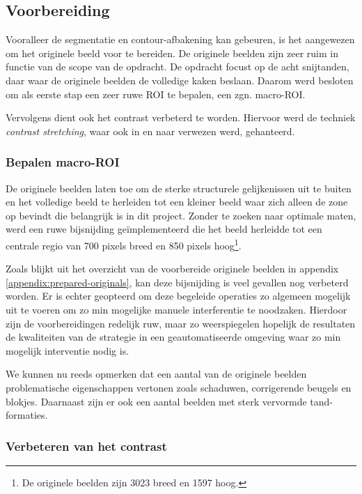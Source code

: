 \documentclass[10pt,a4paper]{article}
\begin{document}
\subsection*{Voorbereiding}

Vooralleer de segmentatie en contour-afbakening kan gebeuren, is het aangewezen om het originele beeld voor te bereiden. De originele beelden zijn zeer ruim in functie van de scope van de opdracht. De opdracht focust op de acht snijtanden, daar waar de originele beelden de volledige kaken beslaan. Daarom werd besloten om als eerste stap een zeer ruwe ROI te bepalen, een zgn. macro-ROI.

Vervolgens dient ook het contrast verbeterd te worden. Hiervoor werd de techniek \emph{contrast stretching}, waar ook in  \cite{piotrowski2000active} en \cite{said2004dental} naar verwezen werd, gehanteerd.

\subsubsection*{Bepalen macro-ROI}

De originele beelden laten toe om de sterke structurele gelijkenissen uit te buiten en het volledige beeld te herleiden tot een kleiner beeld waar zich alleen de zone op bevindt die belangrijk is in dit project. Zonder te zoeken naar optimale maten, werd een ruwe bijsnijding ge\"implementeerd die het beeld herleidde tot een centrale regio van 700 pixels breed en 850 pixels hoog\footnote{De originele beelden zijn 3023 breed en 1597 hoog.}.

Zoals blijkt uit het overzicht van de voorbereide originele beelden in appendix \ref{appendix:prepared-originals}, kan deze bijsnijding is veel gevallen nog verbeterd worden. Er is echter geopteerd om deze begeleide operaties zo algemeen mogelijk uit te voeren om zo min mogelijke manuele interferentie te noodzaken. Hierdoor zijn de voorbereidingen redelijk ruw, maar zo weerspiegelen hopelijk de resultaten de kwaliteiten van de strategie in een geautomatiseerde omgeving waar zo min mogelijk interventie nodig is.

We kunnen nu reeds opmerken dat een aantal van de originele beelden problematische eigenschappen vertonen zoals schaduwen, corrigerende beugels en blokjes. Daarnaast zijn er ook een aantal beelden met sterk vervormde tand-formaties.

\subsubsection*{Verbeteren van het contrast}
\end{document}
